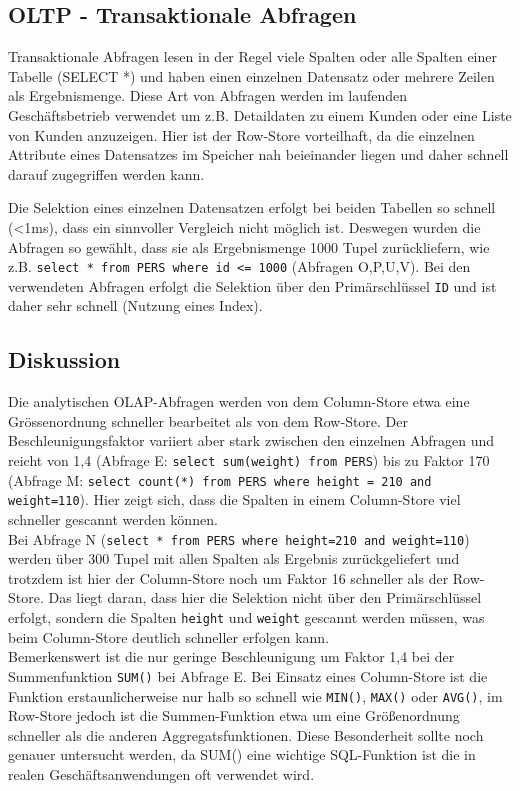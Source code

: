 \subsection{OLTP - Transaktionale Abfragen}
Transaktionale Abfragen lesen in der Regel viele Spalten oder alle Spalten einer
Tabelle (SELECT *) und haben einen einzelnen Datensatz oder mehrere Zeilen als
Ergebnismenge. Diese Art von Abfragen werden im laufenden Geschäftsbetrieb verwendet
um z.B. Detaildaten zu einem Kunden oder eine Liste von Kunden anzuzeigen.
Hier ist der Row-Store vorteilhaft, da die einzelnen Attribute eines Datensatzes
im Speicher nah beieinander liegen und daher schnell darauf zugegriffen werden kann.

Die Selektion eines einzelnen Datensatzen erfolgt bei beiden Tabellen so schnell (<1ms),
dass ein sinnvoller Vergleich nicht möglich ist. Deswegen wurden die Abfragen so 
gewählt, dass sie als Ergebnismenge 1000 Tupel zurückliefern, wie z.B. 
\texttt{select * from PERS where id <= 1000} (Abfragen O,P,U,V).
Bei den verwendeten Abfragen erfolgt die Selektion über den Primärschlüssel \texttt{ID}
und ist daher sehr schnell (Nutzung eines Index).

\subsection{Diskussion}
Die analytischen OLAP-Abfragen werden von dem Column-Store etwa eine Grössenordnung
schneller bearbeitet als von dem Row-Store. Der Beschleunigungsfaktor variiert aber 
stark zwischen den einzelnen Abfragen und reicht von 1,4 (Abfrage E: 
\texttt{select sum(weight) from PERS}) bis zu Faktor 170 (Abfrage M: \texttt{select count(*) from PERS where
height = 210 and weight=110}). Hier zeigt sich, dass die Spalten in einem
Column-Store viel schneller gescannt werden können.\\
Bei Abfrage N (\texttt{select * from PERS where height=210 and weight=110}) werden
über 300 Tupel mit allen Spalten als Ergebnis zurückgeliefert und trotzdem ist hier
der Column-Store noch um Faktor 16 schneller als der Row-Store. Das liegt daran,
dass hier die Selektion nicht über den Primärschlüssel erfolgt, sondern die Spalten
\texttt{height} und \texttt{weight} gescannt werden müssen, was beim Column-Store
deutlich schneller erfolgen kann.\\
Bemerkenswert ist die nur geringe Beschleunigung um Faktor 1,4 bei der Summenfunktion
\texttt{SUM()} bei Abfrage E. Bei Einsatz eines Column-Store ist die Funktion 
erstaunlicherweise nur halb so schnell wie
\texttt{MIN()}, \texttt{MAX()} oder \texttt{AVG()}, im Row-Store jedoch ist die 
Summen-Funktion etwa um eine Größenordnung schneller als die  anderen Aggregatsfunktionen.
Diese Besonderheit sollte noch genauer untersucht werden, da SUM() eine wichtige 
SQL-Funktion ist die in realen Geschäftsanwendungen oft verwendet wird.

